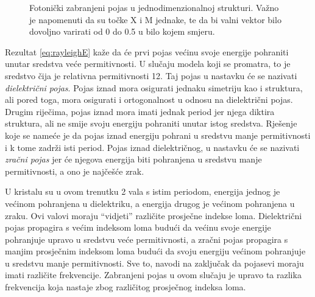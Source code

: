 \documentclass[utf8, seminar, numeric]{fer}
\begin{document}
\begin{figure}[ht]
\centering
    \qquad
	\caption{Fotonički zabranjeni pojas u jednodimenzionalnoj strukturi.
	Važno je napomenuti da su točke X i M jednake, te da bi valni vektor bilo
	dovoljno varirati od 0 do 0.5 u bilo kojem smjeru.}
	\label{fig:1d_band_diagram}
\end{figure}


Rezultat \ref{eq:rayleighE} kaže da će prvi pojas većinu svoje energije
pohraniti unutar sredstva veće permitivnosti. U slučaju modela koji se
promatra, to je sredstvo čija je relativna permitivnosti 12. Taj pojas
u nastavku će se nazivati \emph{dielektrični pojas}. Pojas iznad mora
osigurati jednaku simetriju kao i struktura, ali pored toga, mora osigurati i
ortogonalnost u odnosu na dielektrični pojas. Drugim riječima, pojas iznad
mora imati jednak period jer njega diktira struktura, ali ne smije svoju
energiju pohraniti unutar istog sredstva. Rješenje koje se nameće je da pojas
iznad energiju pohrani u sredstvu manje permitivnosti i k tome zadrži
isti period. Pojas iznad dielektričnog, u nastavku će se nazivati \emph{zračni
pojas} jer će njegova energija biti pohranjena u sredstvu manje permitivnosti,
a ono je najčešće zrak.

U kristalu su u ovom trenutku 2 vala s istim periodom, energija jednog je
većinom pohranjena u dielektriku, a energija drugog je većinom pohranjena
u zraku. Ovi valovi moraju ``vidjeti'' različite prosječne indekse loma.
Dielektrični pojas propagira s većim indeksom loma budući da većinu svoje energije
pohranjuje upravo u sredstvu veće permitivnosti, a zračni pojas
propagira s manjim prosječnim indeksom loma budući da svoju energiju
većinom pohranjuje u sredstvu manje permitivnosti. Sve to, navodi na zaključak
da pojasevi moraju imati različite frekvencije. Zabranjeni pojas u ovom
slučaju je upravo ta razlika frekvencija koja nastaje zbog različitog prosječnog
indeksa loma.
\end{document}
